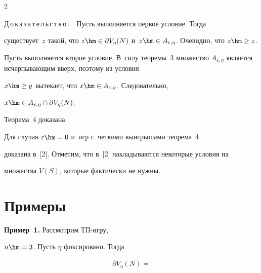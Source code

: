 \begin{multicols}{2}
\smallskip



\noindent

Д\,о\,к\,а\,з\,а\,т\,е\,л\,ь\,с\,т\,в\,о\,.\ \  Пусть выполняется первое условие. Тогда 

существует~$z$ такой, что $z\hm\in \partial V_\eta(N)$ и~$z\hm\in 

A_{\varepsilon,\eta}$. Очевидно, что $z\hm\geq z$.



    Пусть выполняется второе условие. В~силу тео\-ре\-мы~3 множество $ 

A_{\varepsilon,\eta}$ является исчерпывающим вверх, поэтому из условия 

$x\hm\geq y$ вытекает, что $x\hm\in A_{\varepsilon,\eta}$. Следовательно, 

$x\hm\in A_{\varepsilon,\eta} \cap \partial V_\eta(N)$. 



    Теорема~4 доказана.



\smallskip



    Для случая $\varepsilon\hm=0$ и~игр с~четкими выигрышами теорема~4 

доказана в~[2]. Отметим, что в~[2] накладываются некоторые условия на 

множества $V(S)$, которые фактически не нужны.



\vspace*{-7pt} 



\section{Примеры}



\vspace*{-2pt}



     \textbf{Пример~1.} Рассмотрим ТП-игру, 

$n\hm=3$. Пусть $\eta$ фиксировано. Тогда



\vspace*{-2pt}



\noindent

     \begin{multline*}

     \partial V_\eta(N) ={}\\


\end{multline*}
\end{multicols}
